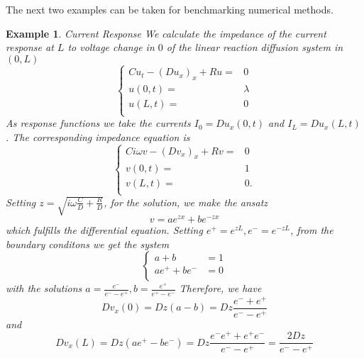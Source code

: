 \documentclass[10pt]{amsart}
\newtheorem{example}{Example}
\begin{document}
The next two examples can be taken for benchmarking numerical methods.
\begin{example}{Current Response}
  We calculate the impedance of the current response at $L$ to voltage change in $0$ of the linear reaction  diffusion system in $(0,L)$  
  \begin{equation*}
    \begin{cases}
      Cu_t - (Du_x)_x + Ru=&0\\
      u(0,t)=&\lambda\\
      u(L,t)=&0\\
    \end{cases}
  \end{equation*}
    As response functions we take the currents  $I_0=Du_x(0,t)$ and $I_L=Du_x(L,t)$.
    The corresponding impedance equation is
    \begin{equation*}
      \begin{cases}
        Ci\omega v - (Dv_x)_x +Rv =&0\\
        v(0,t)=&1\\
        v(L,t)=&0.\\
      \end{cases}
    \end{equation*}
Setting $z=\sqrt{i\omega\frac{C}{D}+\frac{R}{D}}$, for the solution, we make the ansatz
\begin{equation*}
  v=ae^{zx}+be^{-zx}
\end{equation*}
which fulfills the differential equation.
Setting $e^+=e^{zL},e^-=e^{-zL}$, from the boundary 
conditons we get the system
\begin{equation*}
  \begin{cases}
    a+b&=1\\
    ae^++be^-&=0\\
  \end{cases}
\end{equation*}
with the solutions $a=\frac{e^-}{e^--e^+},b=\frac{e^+}{e^+-e^-}$
Therefore, we have
\begin{equation*}
  Dv_x(0)=Dz(a-b)=Dz\frac{e^-+e^+}{e^--e^+}
\end{equation*}
and
\begin{equation*}
  Dv_x(L)=Dz(ae^+-be^-)=Dz\frac{e^-e^++e^+e^-}{e^--e^+}=\frac{2Dz}{e^--e^+}
\end{equation*}
\end{example}
\end{document}
